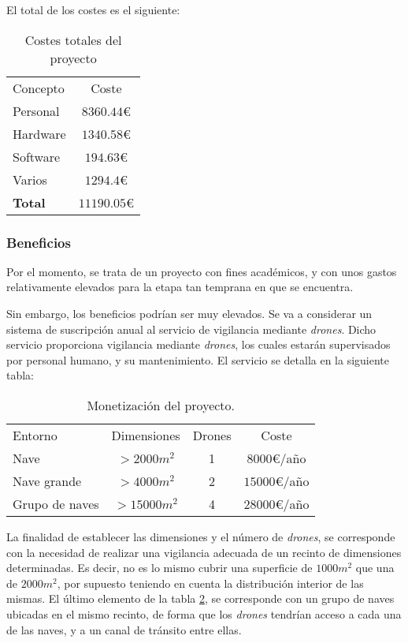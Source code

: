 El total de los costes es el siguiente: 
\begin{table}[H]
	\begin{center}
		\begin{tabular}{l  c}\hline
			\toprule
			Concepto & Coste\\
			\otoprule
			Personal & $8360.44$\euro \\
			Hardware & $1340.58$\euro \\
			Software & $194.63$\euro\\
			Varios & $1294.4$\euro\\
			\hline
			\textbf{Total} & $11190.05 $\euro\\
			\bottomrule
		\end{tabular}
		\caption{Costes totales del proyecto}
		\label{tb:costesTotales}
	\end{center}
\end{table}


\subsubsection{Beneficios}

Por el momento, se trata de un proyecto con fines académicos, y con unos gastos relativamente elevados para la etapa tan temprana en que se encuentra. 

Sin embargo, los beneficios podrían ser muy elevados. Se va a considerar un sistema de suscripción anual al servicio de vigilancia mediante \emph{drones}. Dicho servicio proporciona vigilancia mediante \emph{drones}, los cuales estarán supervisados por personal humano, y su mantenimiento. El servicio se detalla en la siguiente tabla: 
\begin{table}[H]
\begin{center}
		\begin{tabular}{l  c  c  c}\hline
			\toprule
			Entorno & Dimensiones & Drones & Coste\\
			\otoprule
			Nave & $>2000 m^2$ &  1 & $8000$\euro/año\\
			Nave grande & $>4000 m^2$ & 2 & $15000 $\euro/año\\
			Grupo de naves & $>15000 m^2$ & 4 & $28000$\euro/año\\
			\bottomrule
		\end{tabular}
		\caption{Monetización del proyecto.}
		\label{tb:money}
		\end{center}
\end{table}

La finalidad de establecer las dimensiones y el número de \emph{drones}, se corresponde con la necesidad de realizar una vigilancia adecuada de un recinto de dimensiones determinadas. Es decir, no es lo mismo cubrir una superficie de $1000m^2$ que una de $2000m^2$, por supuesto teniendo en cuenta la distribución interior de las mismas. 
El último elemento de la tabla \ref{tb:money}, se corresponde con un grupo de naves ubicadas en el mismo recinto, de forma que los \emph{drones} tendrían acceso a cada una de las naves, y a un canal de tránsito entre ellas. 

